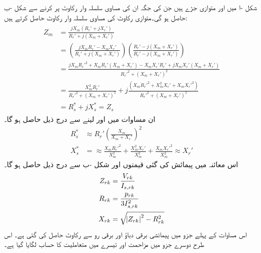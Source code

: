 شکل  -ا میں   اور  متوازی جڑے ہیں جن  کی جگہ ان کی مساوی سلسلہ وار رکاوٹ پر کرنے سے شکل -ب حاصل ہو گی۔متوازی رکاوٹ  کی مساوی سلسلہ وار رکاوٹ   حاصل کرتے ہیں:
\begin{gather}
\begin{aligned}
Z_m&=\frac{j X_m (R_r'+j X_r')}{R_r'+j(X_m+X_r')}\\
&=\left( \frac{j X_m R_r' -X_m X_r'}{R_r'+j(X_m+X_r')} \right) \left( \frac{R_r'-j(X_m+X_r')}{R_r'-j(X_m+X_r')}\right)\\
&=\frac{jX_m R_r'^2+X_m R_r'(X_m+X_r')-X_m X_r' R_r' +j X_m X_r'(X_m+X_r')}{R_r'^2+(X_m+X_r')^2}\\
&=\frac{X_m^2 R_r'}{R_r'^2+(X_m+X_r')^2}+j\frac{(X_m R_r'^2+X_m^2 X_r'+X_m X_r'^2)}{R_r'^2+(X_m+X_r')^2}\\
&=R_s^*+j X_s^* =Z_s
\end{aligned}
\end{gather}
ان مساوات میں  اور   لینے سے درج ذیل حاصل ہو گا۔
\begin{align}\label{مساوات_امالی_تقریبا_مزاحمت}
R_s^*& \approx R_r' \left(\frac{X_m}{X_m+X_r'} \right)^2 \\
X_s^*&= \approx  \frac{X_m R_r'^2}{X_m^2}+\frac{X_m^2 X_r'}{X_m^2}+\frac{X_m X_r'^2}{X_m^2} \approx X_r'
\end{align}
اس معائنہ میں پیمائش کی گئی قیمتوں اور شکل -ب سے درج ذیل حاصل ہو گا۔
\begin{gather}
\begin{aligned}
Z_{rk} &=\frac{V_{rk}}{I_{s,rk}}\\
R_{rk}&=\frac{p_{rk}}{3 I_{s,rk}^2}\\
X_{rk}&=\sqrt{\abs{Z_{rk}}^2-R_{rk}^2}
\end{aligned}
\end{gather}
اس مساوات کے پہلے جزو میں پیمائشی برقی دباؤ اور برقی رو سے رکاوٹ حاصل کی گئی ہے۔ اس طرح دوسرے جزو میں مزاحمت اور تیسرے میں متعاملیت کا حساب لگایا گیا ہے۔

